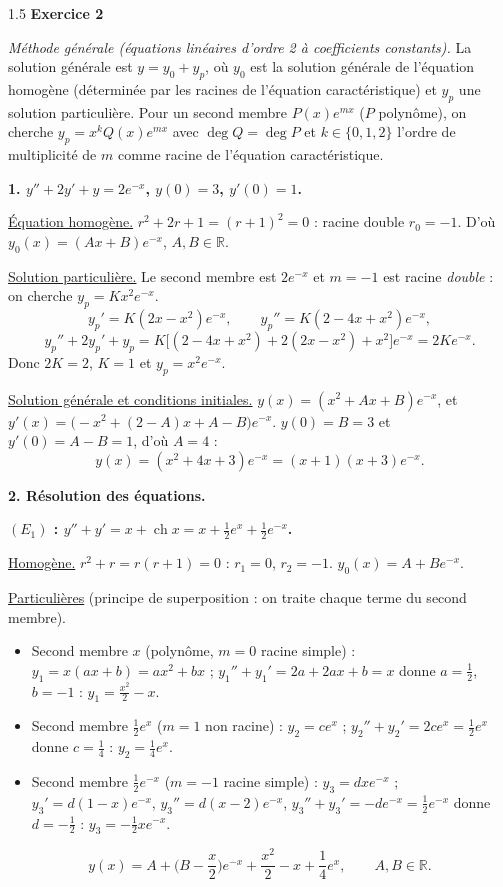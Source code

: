 \documentclass[12pt]{article}
\begin{document}
\begin{spacing}{1.5}
\medskip\textbf{Exercice 2}

\emph{Méthode générale (équations linéaires d'ordre 2 à coefficients constants).} La solution générale est $y=y_0+y_p$, où $y_0$ est la solution générale de l'équation homogène (déterminée par les racines de l'équation caractéristique) et $y_p$ une solution particulière. Pour un second membre $P(x)e^{mx}$ ($P$ polynôme), on cherche $y_p=x^kQ(x)e^{mx}$ avec $\deg Q=\deg P$ et $k\in\{0,1,2\}$ l'ordre de multiplicité de $m$ comme racine de l'équation caractéristique.

\textbf{1. $y''+2y'+y=2e^{-x}$, $y(0)=3$, $y'(0)=1$.}

\underline{Équation homogène.} $r^2+2r+1=(r+1)^2=0$ : racine double $r_0=-1$. D'où $y_0(x)=(Ax+B)e^{-x}$, $A,B\in\mathbb{R}$.

\underline{Solution particulière.} Le second membre est $2e^{-x}$ et $m=-1$ est racine \emph{double} : on cherche $y_p=Kx^2e^{-x}$.
\[
y_p'=K(2x-x^2)e^{-x},\qquad y_p''=K(2-4x+x^2)e^{-x},
\]
\[
y_p''+2y_p'+y_p=K\big[(2-4x+x^2)+2(2x-x^2)+x^2\big]e^{-x}=2Ke^{-x}.
\]
Donc $2K=2$, $K=1$ et $y_p=x^2e^{-x}$.

\underline{Solution générale et conditions initiales.} $y(x)=(x^2+Ax+B)e^{-x}$, et $y'(x)=\big(-x^2+(2-A)x+A-B\big)e^{-x}$.
$y(0)=B=3$ et $y'(0)=A-B=1$, d'où $A=4$ :
\[
\boxed{y(x)=(x^2+4x+3)e^{-x}=(x+1)(x+3)e^{-x}}.
\]

\textbf{2. Résolution des équations.}

\textbf{$(E_1)$ : $y''+y'=x+\operatorname{ch}x=x+\frac12e^x+\frac12e^{-x}$.}

\underline{Homogène.} $r^2+r=r(r+1)=0$ : $r_1=0$, $r_2=-1$. $y_0(x)=A+Be^{-x}$.

\underline{Particulières} (principe de superposition : on traite chaque terme du second membre).
\begin{itemize}
\item Second membre $x$ (polynôme, $m=0$ racine simple) : $y_1=x(ax+b)=ax^2+bx$ ; $y_1''+y_1'=2a+2ax+b=x$ donne $a=\frac12$, $b=-1$ : $y_1=\frac{x^2}{2}-x$.
\item Second membre $\frac12e^x$ ($m=1$ non racine) : $y_2=ce^x$ ; $y_2''+y_2'=2ce^x=\frac12e^x$ donne $c=\frac14$ : $y_2=\frac14e^x$.
\item Second membre $\frac12e^{-x}$ ($m=-1$ racine simple) : $y_3=dxe^{-x}$ ; $y_3'=d(1-x)e^{-x}$, $y_3''=d(x-2)e^{-x}$, $y_3''+y_3'=-de^{-x}=\frac12e^{-x}$ donne $d=-\frac12$ : $y_3=-\frac12xe^{-x}$.
\end{itemize}
\[
\boxed{y(x)=A+\Big(B-\frac x2\Big)e^{-x}+\frac{x^2}{2}-x+\frac14e^x,\qquad A,B\in\mathbb{R}}.
\]


\end{spacing}
\end{document}
